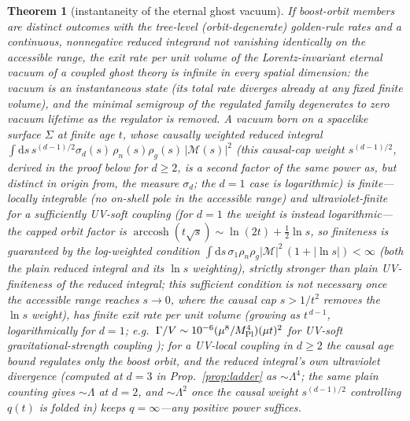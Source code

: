 \documentclass[11pt]{article}
\newtheorem{theorem}{Theorem}[section]
\theoremstyle{definition}
\theoremstyle{remark}
\newcommand{\dd}{\mathrm{d}}
\begin{document}
\begin{theorem}[instantaneity of the eternal ghost vacuum]
\label{thm:instantaneity}
If boost-orbit members are distinct outcomes \emph{with the
tree-level (orbit-degenerate) golden-rule rates} and a continuous, nonnegative reduced integrand not vanishing identically on the accessible range, the exit
rate \emph{per unit volume} of the Lorentz-invariant eternal vacuum of a coupled ghost
theory is infinite in every spatial dimension: the vacuum is an instantaneous
state (its total rate diverges already at any fixed finite volume), and the minimal semigroup of the regulated family degenerates
to zero vacuum lifetime as the regulator is removed. A vacuum
\emph{born} on a spacelike surface $\Sigma$ at finite age $t$, whose
\emph{causally weighted} reduced integral
$\int\dd s\,s^{(d-1)/2}\sigma_d(s)\,\rho_n(s)\rho_g(s)\,|\mathcal M(s)|^{2}$
(this causal-cap weight $s^{(d-1)/2}$, derived in the proof below for $d\ge2$, is a second factor of the same power as, but distinct in origin from, the measure $\sigma_d$; the $d=1$ case is logarithmic)
is finite---locally integrable (no on-shell pole in the accessible range) and ultraviolet-finite for a sufficiently UV-soft coupling (for $d=1$ the
weight is instead \emph{logarithmic}---the capped orbit factor is
$\operatorname{arccosh}(t\sqrt s)\sim\ln(2t)+\tfrac12\ln s$, so
finiteness is guaranteed by the log-weighted condition
$\int\dd s\,\sigma_1\rho_n\rho_g|\mathcal M|^{2}\,(1+|\ln s|)<\infty$
(both the plain reduced integral and its $\ln s$ weighting), strictly
stronger than plain UV-finiteness of the reduced integral; this
sufficient condition is not necessary once the accessible range reaches
$s\to0$, where the causal cap $s>1/t^2$ removes the $\ln s$ weight), has finite
exit rate per unit volume (growing as
$t^{\,d-1}$, logarithmically for $d=1$; e.g.\
$\Gamma/V\sim10^{-6}(\mu^{8}/M_{\rm Pl}^{4})(\mu t)^{2}$ for UV-soft
gravitational-strength coupling \cite{GV2013}); for a UV-local coupling
in $d\ge2$ the causal age bound regulates only the boost orbit, and the
reduced integral's own ultraviolet divergence (computed at $d=3$ in
Prop.~\ref{prop:ladder} as $\sim\Lambda^{4}$; the same plain counting gives
$\sim\Lambda$ at $d=2$, and $\sim\Lambda^{2}$ once the causal weight
$s^{(d-1)/2}$ controlling $q(t)$ is folded in) keeps $q=\infty$---any positive
power suffices.
\end{theorem}
\end{document}
